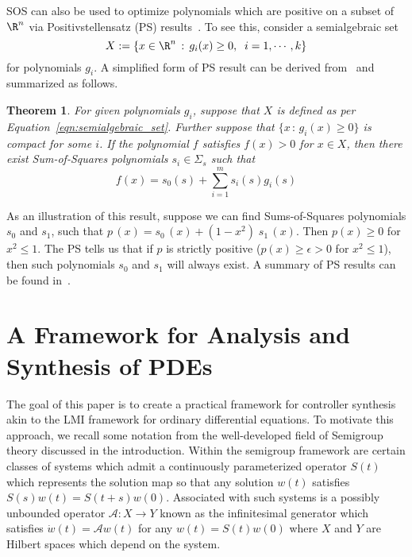 \documentclass[9pt,journal,twocolumn]{IEEEtran}
\newtheorem{theorem}{Theorem}
\begin{document}
SOS can also be used to optimize polynomials which are positive on a subset of $\R^n$ via Positivstellensatz (PS) results~\cite{stengle1974nullstellensatz,
schmudgen1991thek,putinar1993positive,jacobi2001representation}. To see this, consider a semialgebraic set
\begin{equation}
X:=\{x \in \R^n\,:\, g_i(x)\ge 0,\;\; i=1,\cdots,k\}\label{eqn:semialgebraic_set}
\end{equation}
for polynomials $g_i$. A simplified form of PS result can be derived from~\cite{putinar1993positive} and summarized as follows.
\begin{theorem}
For given polynomials $g_i$, suppose that $X$ is defined as per Equation~\eqref{eqn:semialgebraic_set}. Further suppose that $\{x\,:\, g_i(x) \ge 0\}$ is compact for some $i$. If the polynomial $f$ satisfies $f(x)>0$ for $x \in X$, then there exist Sum-of-Squares polynomials $s_i \in \Sigma_s$ such that
\begin{equation*}
f(x) = s_0(s) + \sum_{i=1}^m s_i(s)g_i(s)
\end{equation*}
\end{theorem}
As an illustration of this result, suppose we can find Sums-of-Squares polynomials $s_0$ and $s_1$, such that $p\,(x)=s_0\,(x)+ (1-x^2) \; s_1\,(x)$. Then $p(x)\ge 0$ for $x^2\le 1$. The PS tells us that if $p$ is strictly positive ($p(x)\ge \epsilon>0$ for $x^2 \le 1$), then such polynomials $s_0$ and $s_1$ will always exist. A summary of PS results can be found in~\cite{scheiderer2009positivity}.


\section{A Framework for Analysis and Synthesis of PDEs}


The goal of this paper is to create a practical framework for controller synthesis akin to the LMI framework for ordinary differential equations. To motivate this approach, we recall some notation from the well-developed field of Semigroup theory discussed in the introduction. Within the semigroup framework are certain classes of systems which admit a continuously parameterized operator $S(t)$ which represents the solution map so that any solution $w(t)$ satisfies $S(s)w(t) = S(t+s)w(0)$. Associated with such systems is a possibly unbounded operator $\mathcal{A}:X\rightarrow Y$ known as the infinitesimal generator which satisfies $\dot w(t) = \mathcal{A}w(t)$ for any $w(t)=S(t)w(0)$ where $X$ and $Y$ are Hilbert spaces which depend on the system.
\end{document}
